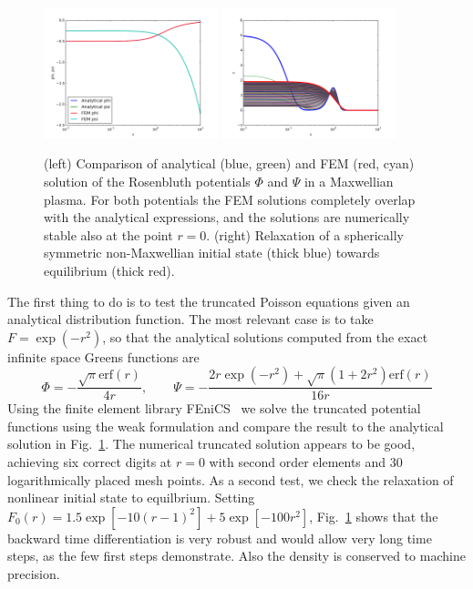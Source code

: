 \documentclass[reprint]{revtex4}
\newcommand{\erf}{\textrm{erf}}
\begin{document}
\begin{figure}[!h]
\includegraphics[width=0.45\textwidth]{fig/phi_psi.png}
\includegraphics[width=0.45\textwidth]{fig/f_relaxation.png}
\caption{(left) Comparison of analytical (blue, green) and FEM (red, cyan) solution of the Rosenbluth potentials $\Phi$ and $\Psi$ in a Maxwellian plasma. For both potentials the FEM solutions completely overlap with the analytical expressions, and the solutions are numerically stable also at the point $r=0$. (right) Relaxation of a spherically symmetric non-Maxwellian initial state (thick blue) towards equilibrium (thick red).}
\label{fig:spherical_test}
\end{figure}
The first thing to do is to test the truncated Poisson equations given an analytical distribution function. The most relevant case is to take $F=\exp(-r^2)$, so that the analytical solutions computed from the exact infinite space Greens functions are
\begin{equation}
\Phi=-\frac{\sqrt{\pi}\erf(r)}{4r},\qquad
\Psi=-\frac{2r\exp(-r^2)+\sqrt{\pi}(1+2r^2)\erf(r)}{16r}
\end{equation}
Using the finite element library \rm{FEniCS}~\cite{dolfin_ref} we solve the truncated potential functions using the weak formulation and compare the result to the analytical solution in Fig.~\ref{fig:spherical_test}. The numerical truncated solution appears to be good, achieving six correct digits at $r=0$ with second order elements and 30 logarithmically placed mesh points. As a second test, we check the relaxation of nonlinear initial state to equilbrium. Setting $F_0(r)=1.5\exp\left[-10(r-1)^2\right]+5\exp\left[-100r^2\right]$, Fig.~\ref{fig:spherical_test} shows that the backward time differentiation is very robust and would allow very long time steps, as the few first steps demonstrate. Also the density is conserved to machine precision.
\end{document}
